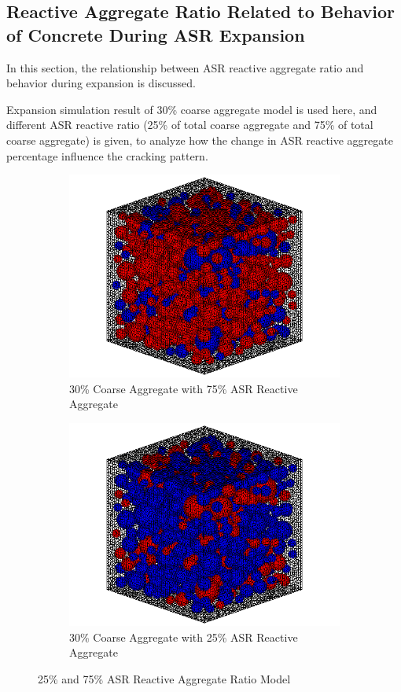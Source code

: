 \clearpage
\subsection{Reactive Aggregate Ratio Related to Behavior of Concrete During ASR Expansion}

In this section, the relationship between ASR reactive aggregate ratio and behavior during expansion is discussed.

Expansion simulation result of 30\% coarse aggregate model is used here, and different ASR reactive ratio (25\% of total coarse aggregate and 75\% of total coarse aggregate) is given, to analyze how the change in ASR reactive aggregate percentage influence the cracking pattern.

\begin{figure}[!h]
\centering
\begin{subfigure}{.5\textwidth}
  \centering
  \includegraphics[width=.8\linewidth]{Files/Aggregate/A30P75.png}%
  \caption{30\% Coarse Aggregate with 75\% ASR Reactive Aggregate}
  \label{fig:A15_model}
\end{subfigure}%
\begin{subfigure}{.5\textwidth}
  \centering
  \includegraphics[width=.8\linewidth]{Files/Aggregate/A30P25.png} %
  \caption{30\% Coarse Aggregate with 25\% ASR Reactive Aggregate}
  \label{fig:A15_model}
\end{subfigure}
\caption{25\% and 75\% ASR Reactive Aggregate Ratio Model}
\label{fig:Aggregate_Percentage}
\end{figure}

